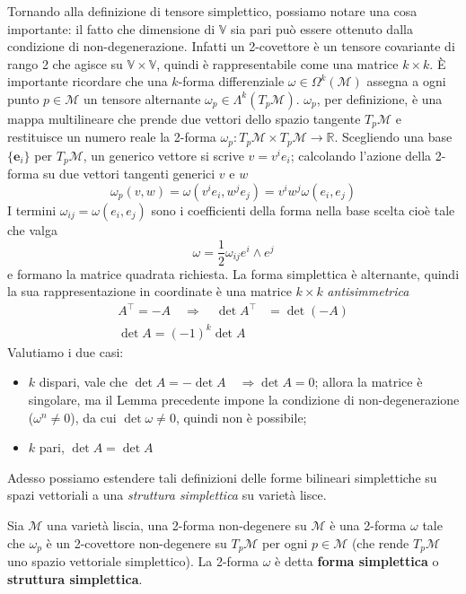 Tornando alla definizione di tensore simplettico, possiamo notare una cosa importante: il fatto che dimensione di $\mathbb{V}$ sia pari può essere ottenuto dalla condizione di non-degenerazione.
Infatti un 2-covettore è un tensore covariante di rango 2 che agisce su $\mathbb{V} \times \mathbb{V}$, quindi è rappresentabile come una matrice $k \times k$.
È importante ricordare che una $k$-forma differenziale $\omega \in \Omega^k(\mathcal{M})$ assegna a ogni punto $p \in \mathcal{M}$ un tensore alternante $\omega_p \in \Lambda^k(T_p \mathcal{M})$.
$\omega_p$, per definizione, è una mappa multilineare che prende due vettori dello spazio tangente $T_p \mathcal{M}$ e restituisce un numero reale la 2-forma \(\omega_p : T_p \mathcal{M} \times T_p\mathcal{M} \longrightarrow \mathbb{R}\).
Scegliendo una base \( \{ \mathbf{e}_i \} \) per $T_p \mathcal{M}$, un generico vettore si scrive $v = v^i e_i$; calcolando l'azione della 2-forma su due vettori tangenti generici $v$ e $w$
\[
    \omega_p(v, w) = \omega(v^i e_i, w^j e_j) = v^i w^j \omega(e_i, e_j)
\]
I termini \(\omega_{ij} = \omega(e_i, e_j)\) sono i coefficienti della forma nella base scelta cioè tale che valga
\[
    \omega = \frac{1}{2} \omega_{ij} e^i \wedge e^j
\]
e formano la matrice quadrata richiesta.
La forma simplettica è alternante, quindi la sua rappresentazione in coordinate è una matrice $k \times k$ \emph{antisimmetrica}
\begin{align*}
    A^\intercal = - A \quad \Longrightarrow \quad \det A^\intercal & = \det (-A) \\
    \det A = (-1)^k \det A
\end{align*}
Valutiamo i due casi: \begin{itemize}
    \item $k$ dispari, vale che $\det A = - \det A \quad \Longrightarrow \det A = 0$; allora la matrice è singolare, ma il Lemma precedente impone la condizione di non-degenerazione (\(\omega^n \neq 0\)), da cui $\det \omega \neq 0$, quindi non è possibile;
    \item $k$ pari, $\det A = \det A$ \checkmark
\end{itemize}


Adesso possiamo estendere tali definizioni delle forme bilineari simplettiche su spazi vettoriali a una \emph{struttura simplettica} su varietà lisce.
\begin{definition}
    \cite{lee_manifolds} Sia $\mathcal{M}$ una varietà liscia, una 2-forma non-degenere su $\mathcal{M}$ è una 2-forma $\omega$ tale che $\omega_p$ è un 2-covettore non-degenere su $T_p \mathcal{M}$ per ogni $p \in \mathcal{M}$ (che rende $T_p \mathcal{M}$ uno spazio vettoriale simplettico).
    La 2-forma $\omega$ è detta \textbf{forma simplettica} o \textbf{struttura simplettica}.
\end{definition}

